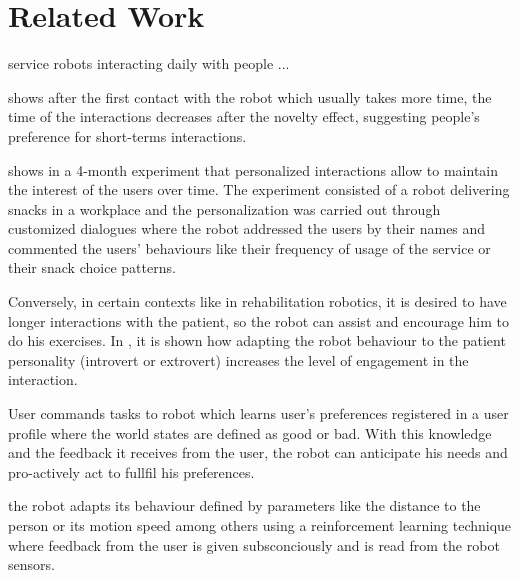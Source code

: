 \section{Related Work}


service robots interacting daily with people ...

\cite{gockley2005} shows after the first contact with the robot which
usually takes more time, the time of the interactions decreases after
the novelty effect, suggesting people's preference for short-terms
interactions. 

\cite{Lee2012} shows in a 4-month experiment that personalized
interactions allow to maintain the interest of the users over time.
The experiment consisted of a robot delivering snacks in a workplace
and the personalization was carried out through customized dialogues where the
robot addressed the users by their names and commented the users'
behaviours like their frequency of usage of the service or their snack choice patterns.

Conversely, in certain contexts like in rehabilitation robotics, it is
desired to have longer interactions with the patient, so the robot can
assist and encourage him to do his exercises. In \cite{tapus2008}, it
is shown how adapting the robot behaviour to the patient personality
(introvert or extrovert) increases the level of engagement in the
interaction.



\cite{mason2011robot} User commands tasks to robot which learns user's preferences
registered in a user profile where the world states are defined as
good or bad. With this knowledge and the feedback it receives from the user, the robot can anticipate his needs and
pro-actively act to fullfil his preferences.

\cite{mitsunaga2008adapting} the robot adapts its behaviour defined by
parameters like the distance to the person or its motion speed among
others using a reinforcement learning technique where feedback from
the user is given subsconciously and is read from the robot sensors.
